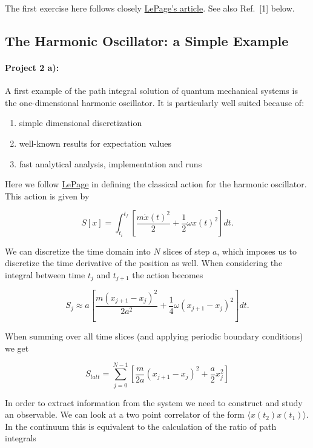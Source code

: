 \documentclass[%
oneside,                 %
final,                   %
10pt]{article}
\begin{document}
The first exercise here follows closely \href{{https://arxiv.org/pdf/hep-lat/0506036.pdf}}{LePage's article}. See also Ref.~[1] below.

\subsection{The Harmonic Oscillator: a Simple Example}

\paragraph{Project 2 a):}
A first example of the path integral solution of quantum mechanical
systems is the one-dimensional harmonic oscillator. It is particularly
well suited because of:

\begin{enumerate}
\item simple dimensional discretization

\item well-known results for expectation values

\item fast analytical analysis, implementation and runs 
\end{enumerate}

\noindent
Here we follow \href{{https://arxiv.org/pdf/hep-lat/0506036.pdf}}{LePage} in defining
the classical action for the harmonic oscillator. This action is given by

\[
	S[x] = \int_{t_i}^{t_f} \left[ \frac{m\dot{x}(t)^2}{2} + \frac{1}{2}\omega x(t)^2\right] dt.
\]

We can discretize the time domain into $N$ slices of step $a$, which
imposes us to discretize the time derivative of the position as
well. When considering the integral between time $t_j$ and $t_{j+1}$
the action becomes

\[
	S_{j} \approx a\left[ \frac{m(x_{j+1}-x_j)^2}{2a^2} + \frac{1}{4}\omega (x_{j+1} - x_j)^2 \right] dt.
\]

When summing over all time slices (and applying periodic boundary conditions) we get

\[	
	S_{latt} = \sum_{j = 0}^{N-1} \left[ \frac{m}{2a}(x_{j+1}-x_j)^2 + \frac{a}{2} x_j^2 \right]
\]

In order to extract information from the system we need to construct
and study an observable. We can look at a two point correlator of the
form $\langle x(t_2)x(t_1) \rangle$.  In the continuum this is
equivalent to the calculation of the ratio of path integrals
\end{document}
